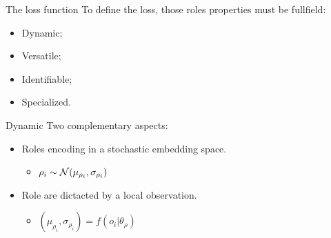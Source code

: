 \documentclass{beamer}
\begin{document}
    \begin{frame}{The loss function}
        To define the loss, those roles properties must be fullfield:

        \begin{itemize}
            \item Dynamic;
            \item Versatile;
            \item Identifiable;
            \item Specialized.
        \end{itemize}
    \end{frame}

    \begin{frame}{Dynamic}
        Two complementary aspects:

        \begin{itemize}
            \item Roles encoding in a stochastic embedding space.
            \begin{itemize}
                \item $\rho_i \sim \mathcal{N}(\mu_{\rho_i},\sigma_{\rho_i})$
            \end{itemize}
            \item Role are dictacted by a local observation.
            \begin{itemize}
                \item $(\mu_{\rho_i},\sigma_{\rho_i}) = f(o_i|\theta_{\rho})$
            \end{itemize}
        \end{itemize}

    \end{frame}
\end{document}
